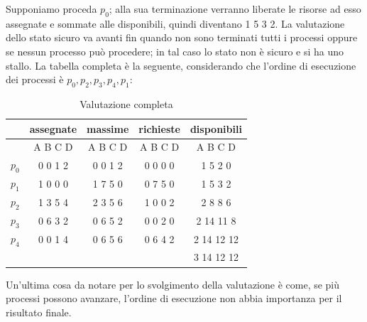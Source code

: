 \noindent Supponiamo proceda $p_0$; alla sua terminazione verranno liberate le risorse ad esso assegnate e sommate alle disponibili, quindi diventano
1 5 3 2. La valutazione dello stato sicuro va avanti fin quando non sono terminati tutti i processi oppure se nessun processo può procedere; in tal caso
lo stato non è sicuro e si ha uno stallo. La tabella completa è la seguente, considerando che l'ordine di esecuzione dei processi è $p_0, p_2, p_3, p_4,
p_1$: \begin{table}[h]
    \centering
    \begin{tabular}{|c|c|c|c|c|}
        \hline
        & assegnate & massime & richieste & disponibili\\
        \hline
        & A B C D & A B C D & A B C D & A B C D\\
        \hline
        $p_0$ & 0 0 1 2 & 0 0 1 2 & 0 0 0 0 & 1 5 2 0\\
        \hline
        $p_1$ & 1 0 0 0 & 1 7 5 0 & 0 7 5 0 & 1 5 3 2\\
        \hline
        $p_2$ & 1 3 5 4 & 2 3 5 6 & 1 0 0 2 & 2 8 8 6\\
        \hline
        $p_3$ & 0 6 3 2 & 0 6 5 2 & 0 0 2 0 & 2 14 11 8\\
        \hline
        $p_4$ & 0 0 1 4 & 0 6 5 6 & 0 6 4 2 & 2 14 12 12\\
        \hline
        & & & & 3 14 12 12\\
        \hline
    \end{tabular}
    \caption{Valutazione completa}
\end{table}

\noindent Un'ultima cosa da notare per lo svolgimento della valutazione è come, se più processi possono avanzare, l'ordine di esecuzione non abbia
importanza per il risultato finale.
